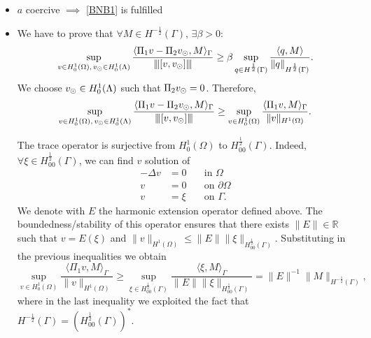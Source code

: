 \begin{itemize}
\item $a$ coercive $\implies$ \eqref{BNB1} is fulfilled

\item We have to prove that $\forall M \in H^{-\frac 12}(\Gamma),\, \exists \beta >0$:
\begin{equation*}
\sup _{v\in H^1_0(\Omega),\, v_{\odot} \in H^1_0(\Lambda)} \frac{ \langle \Pi_1 v  - \Pi_2 v_{\odot}, M \rangle_\Gamma}{{\left\vert\kern-0.25ex\left\vert\kern-0.25ex\left\vert [v, v_{\odot}] \right\vert\kern-0.25ex\right\vert\kern-0.25ex\right\vert}}\geq \beta \sup_{q\in H^{\frac 12}(\Gamma)}\frac{\langle q, M\rangle}{\|q\|_{H^{\frac 12}(\Gamma)}}.
\end{equation*}
We choose $v_{\odot} \in H^1_0(\Lambda)$ such that $\Pi _2v_{\odot} =0$. Therefore,
\begin{equation*}
\sup _{v\in H^1_0(\Omega),\, v_{\odot} \in H^1_0(\Lambda)} \frac{ \langle \Pi_1 v  - \Pi_2 v_{\odot}, M \rangle_\Gamma}{{\left\vert\kern-0.25ex\left\vert\kern-0.25ex\left\vert [v, v_{\odot}] \right\vert\kern-0.25ex\right\vert\kern-0.25ex\right\vert}} 
\geq \sup _{v\in H^1_0(\Omega)} \frac{ \langle \Pi_1 v, M \rangle_\Gamma}{\|v\|_{H^1(\Omega)}}.
\end{equation*}

The trace operator is surjective from $H^1_0(\Omega)$ to $H^{\frac12}_{00}(\Gamma)$. Indeed, $\forall \xi \in H^{\frac 12}_{00}(\Gamma)$, we  can find $v$ solution of
\begin{eqnarray*}
-\Delta v&=0 \quad &\text{in }\Omega\\
v&=0 &\text{on }\partial \Omega\\
v&=\xi &\text{on } \Gamma. 
\end{eqnarray*}
We denote with $E$ the harmonic extension operator defined above.
The boundedness/stability of this operator ensures that there exists $\| E \| \in \mathbb{R}$ such that
$v=E(\xi) $ and $\|v \|_{H^1(\Omega)}\leq \|E\| \|\xi \|_{H^{\frac 12}_{00}(\Gamma)}$. 
Substituting in the previous inequalities we obtain
\begin{equation}\label{infsup_traceop}
\sup _{v\in H^1_0(\Omega)} \frac{ \langle \Pi_1 v, M \rangle_\Gamma}{\|v\|_{H^1(\Omega)}}
\geq  \sup _{\xi \in H^{\frac 12}_{00}(\Gamma )} \frac{ \langle \xi , M \rangle_\Gamma}{\|E\| \|\xi\|_{H^{\frac 12}_{00}(\Gamma)}}
= \|E\|^{-1} \|M\|_{H^{-\frac 12}(\Gamma)},
\end{equation}
where in the last inequality we exploited the fact that $H^{-\frac 12}(\Gamma)=(H^{\frac 12 }_{00}(\Gamma))^*$. 
\end{itemize}


